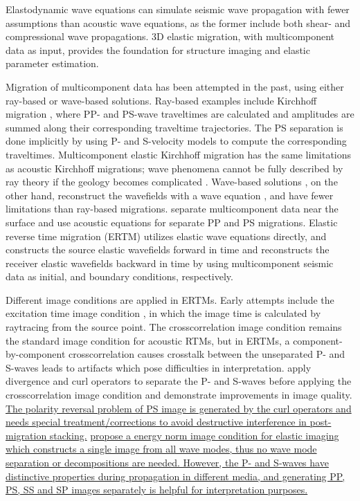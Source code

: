 \documentclass[manuscript,ulem,graphix,revised]{geophysics}
\begin{document}
Elastodynamic wave equations can simulate seismic wave propagation with fewer assumptions than acoustic wave equations, as the former include both shear- and compressional wave propagations. 3D elastic migration, with multicomponent data as input, provides the foundation for structure imaging and elastic parameter estimation.

Migration of multicomponent data has been attempted in the past, using either ray-based or wave-based solutions. Ray-based examples include Kirchhoff migration \citep{kuo84, dai86, hokstad00}, where PP- and PS-wave traveltimes are calculated and amplitudes are summed along their corresponding traveltime trajectories. The PS separation is done implicitly by using P- and S-velocity models to compute the corresponding traveltimes. Multicomponent elastic Kirchhoff migration has the same limitations as acoustic Kirchhoff migrations; wave phenomena cannot be fully described by ray theory if the geology becomes complicated \citep{gray01}. Wave-based solutions \citep{chang86,chang94,whitmore95}, on the other hand, reconstruct the wavefields with a wave equation \citep{wapenaar90}, and have fewer limitations than ray-based migrations. \citet{sun01} separate multicomponent data near the surface and use acoustic equations for separate PP and PS migrations. Elastic reverse time migration (ERTM) utilizes elastic wave equations directly, and constructs the source elastic wavefields forward in time and reconstructs the receiver elastic wavefields backward in time by using multicomponent seismic data as initial, and boundary conditions, respectively.

Different image conditions are applied in ERTMs. Early attempts include the excitation time image condition \citep{chang86}, in which the image time is calculated by raytracing from the source point. The crosscorrelation image condition \citep{claerbout85} remains the standard image condition for acoustic RTMs, but in ERTMs, a component-by-component crosscorrelation causes crosstalk between the unseparated P- and S-waves leads to artifacts which pose difficulties in interpretation. \citet{yan08} apply divergence and curl operators to separate the P- and S-waves before applying the crosscorrelation image condition and demonstrate improvements in image quality. \marginpar{[10]} \uline{The polarity reversal problem of PS image is generated by the curl operators and needs special treatment/corrections \mbox{\citep{du12,du14}} to avoid destructive interference in post-migration stacking.} 
\marginpar{[2]}\uline{\mbox{\citet{rocha16}} propose a energy norm image condition for elastic imaging which constructs a single image from all wave modes, thus no wave mode separation or decompositions are needed. However, the P- and S-waves have distinctive properties during propagation in different media, and generating PP, PS, SS and SP images separately is helpful for interpretation purposes.} 
\end{document}
